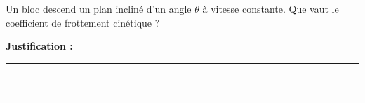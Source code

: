 Un bloc descend un plan incliné d'un angle $\theta$ à vitesse constante. Que vaut le coefficient de frottement cinétique ?

\choices

\noindent\textbf{Justification :} \hrulefill \\[2.5ex]
\rule{\linewidth}{0.4pt} \\[2.5ex]
\rule{\linewidth}{0.4pt}
\vfill
